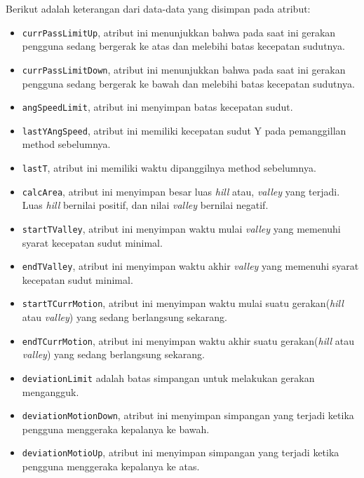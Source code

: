 Berikut adalah keterangan dari data-data yang disimpan pada atribut:
\begin{itemize}
	\item \texttt{currPassLimitUp}, atribut ini menunjukkan bahwa pada saat ini gerakan pengguna sedang bergerak ke atas dan melebihi batas kecepatan sudutnya.
	\item \texttt{currPassLimitDown}, atribut ini menunjukkan bahwa pada saat ini gerakan pengguna sedang bergerak ke bawah dan melebihi batas kecepatan sudutnya.
	\item \texttt{angSpeedLimit}, atribut ini menyimpan batas kecepatan sudut.
	\item \texttt{lastYAngSpeed}, atribut ini memiliki kecepatan sudut Y pada pemanggillan method sebelumnya. 
	\item \texttt{lastT}, atribut ini memiliki waktu dipanggilnya method sebelumnya. 
	\item \texttt{calcArea}, atribut ini menyimpan besar luas \textit{hill} atau, \textit{valley} yang terjadi. Luas \textit{hill} bernilai positif, dan nilai \textit{valley} bernilai negatif. 
	\item \texttt{startTValley}, atribut ini menyimpan waktu mulai \textit{valley} yang memenuhi syarat kecepatan sudut minimal. 
	\item \texttt{endTValley}, atribut ini menyimpan waktu akhir \textit{valley} yang memenuhi syarat kecepatan sudut minimal.
	\item \texttt{startTCurrMotion}, atribut ini menyimpan waktu mulai suatu gerakan(\textit{hill} atau \textit{valley}) yang sedang berlangsung sekarang.
	\item \texttt{endTCurrMotion}, atribut ini menyimpan waktu akhir suatu gerakan(\textit{hill} atau \textit{valley}) yang sedang berlangsung sekarang.
	\item \texttt{deviationLimit} adalah batas simpangan untuk melakukan gerakan mengangguk.
	\item \texttt{deviationMotionDown}, atribut ini menyimpan simpangan yang terjadi ketika pengguna menggeraka kepalanya ke bawah. 
	\item \texttt{deviationMotioUp}, atribut ini menyimpan simpangan yang terjadi ketika pengguna menggeraka kepalanya ke atas. 
\end{itemize}
